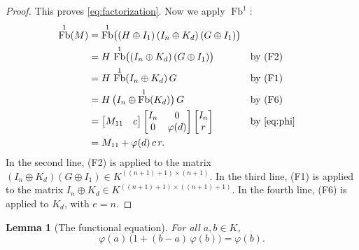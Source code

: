\documentclass[11pt,a4paper]{article}
\theoremstyle{plain}
\newtheorem{lemma}[theorem]{Lemma}
\theoremstyle{definition}
\theoremstyle{remark}
\DeclareMathOperator{\Fb}{Fb}
\begin{document}
\begin{proof}
    This proves \cref{eq:factorization}.
    Now we apply $\Fb^1$:
    \begin{align*}
        \Fb^1(M)
         & = \Fb^1\bigl( (H \oplus I_1)\, (I_n \oplus K_d)\, (G \oplus I_1) \bigr) \\
         & = H\, \Fb^1\bigl( (I_n \oplus K_d)\, (G \oplus I_1) \bigr)               &  & \text{by (F2)} \\
         & = H\, \Fb^1( I_n \oplus K_d )\, G                                        &  & \text{by (F1)} \\
         & = H\, \bigl( I_n \oplus \Fb^1(K_d) \bigr)\, G                            &  & \text{by (F6)} \\
         & = \begin{bmatrix} M_{11} & c \end{bmatrix}
        \begin{bmatrix} I_n & 0 \\ 0 & \varphi(d) \end{bmatrix}
        \begin{bmatrix} I_n \\ r \end{bmatrix}                                     &  & \text{by \cref{eq:phi}} \\
         & = M_{11} + \varphi(d)\, c\, r .
    \end{align*}
    In the second line, (F2) is applied to the matrix $(I_n \oplus K_d)(G \oplus I_1) \in K^{((n+1)+1) \times (n+1)}$.
    In the third line, (F1) is applied to the matrix $I_n \oplus K_d \in K^{((n+1)+1) \times ((n+1)+1)}$.
    In the fourth line, (F6) is applied to $K_d$, with $e = n$.
\end{proof}

\begin{lemma}[The functional equation]
    \label{lem:functional-equation}
    For all $a, b \in K$,
    \begin{equation}
        \label{eq:functional-equation}
        \varphi(a)\, \bigl( 1 + (b - a)\, \varphi(b) \bigr) = \varphi(b) .
    \end{equation}
\end{lemma}
\end{document}
